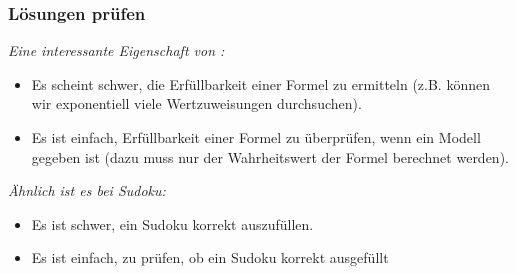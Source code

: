 \documentclass[aspectratio=1610,onlymath]{beamer}
\begin{document}
\begin{frame}\frametitle{Lösungen prüfen}

\emph{Eine interessante Eigenschaft von :}
\begin{itemize}
\item Es scheint schwer, die Erfüllbarkeit einer Formel zu ermitteln (z.B. können wir exponentiell viele
	Wertzuweisungen durchsuchen).
\item Es ist einfach, Erfüllbarkeit einer Formel zu überprüfen, wenn ein Modell gegeben ist (dazu muss nur der Wahrheitswert der Formel berechnet werden).
\end{itemize}\pause

\emph{Ähnlich ist es bei Sudoku:}
\begin{itemize}
\item Es ist schwer, ein Sudoku korrekt auszufüllen.
\item Es ist einfach, zu prüfen, ob ein Sudoku korrekt ausgefüllt 
\end{itemize}\pause


\end{frame}
\end{document}
